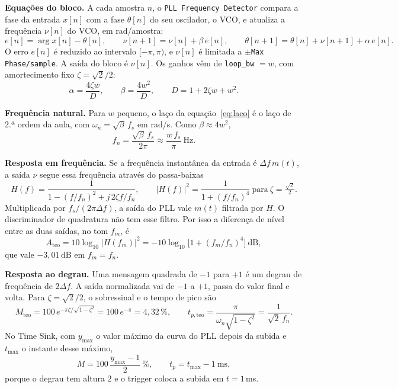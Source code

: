 \documentclass[11pt,a4paper]{article}
\begin{document}
\textbf{Equações do bloco.} A cada amostra $n$, o \texttt{PLL Frequency
Detector} compara a fase da entrada $x[n]$ com a fase $\theta[n]$ do seu
oscilador, o VCO, e atualiza a frequência $\nu[n]$ do VCO, em rad/amostra:
\begin{equation}
  e[n] = \arg x[n] - \theta[n], \qquad
  \nu[n+1] = \nu[n] + \beta\, e[n], \qquad
  \theta[n+1] = \theta[n] + \nu[n+1] + \alpha\, e[n].
  \label{eq:laco}
\end{equation}
O erro $e[n]$ é reduzido ao intervalo $[-\pi, \pi)$, e $\nu[n]$ é limitada a
$\pm$\texttt{Max Phase/sample}. A saída do bloco é $\nu[n]$. Os ganhos vêm de
\texttt{loop\_bw} $= w$, com amortecimento fixo $\zeta = \sqrt2/2$:
\begin{equation}
  \alpha = \frac{4\zeta w}{D}, \qquad \beta = \frac{4w^2}{D}, \qquad
  D = 1 + 2\zeta w + w^2.
  \label{eq:ganhos}
\end{equation}

\textbf{Frequência natural.} Para $w$ pequeno, o laço da
equação~\eqref{eq:laco} é o laço de 2.ª ordem da aula, com
$\omega_n = \sqrt{\beta}\,f_s$ em rad/s. Como $\beta \approx 4w^2$,
\begin{equation}
  f_n = \frac{\sqrt{\beta}\,f_s}{2\pi} \approx \frac{w\,f_s}{\pi}\ \text{Hz}.
  \label{eq:fn}
\end{equation}

\textbf{Resposta em frequência.} Se a frequência instantânea da entrada é
$\Delta f\, m(t)$, a saída $\nu$ segue essa frequência através do passa-baixas
\begin{equation}
  H(f) = \frac{1}{1 - (f/f_n)^2 + j\,2\zeta f/f_n}, \qquad
  |H(f)|^2 = \frac{1}{1 + (f/f_n)^4}\ \text{para}\ \zeta = \tfrac{\sqrt2}{2}.
  \label{eq:H}
\end{equation}
Multiplicada por $f_s/(2\pi\Delta f)$, a saída do PLL vale $m(t)$ filtrada por
$H$. O discriminador de quadratura não tem esse filtro. Por isso a diferença de
nível entre as duas saídas, no tom $f_m$, é
\begin{equation}
  A_\text{teo} = 10\log_{10}|H(f_m)|^2 = -10\log_{10}\!\big[1 + (f_m/f_n)^4\big]\ \text{dB},
  \label{eq:A}
\end{equation}
que vale $-3{,}01$\,dB em $f_m = f_n$.

\textbf{Resposta ao degrau.} Uma mensagem quadrada de $-1$ para $+1$ é um degrau
de frequência de $2\Delta f$. A saída normalizada vai de $-1$ a $+1$, passa do
valor final e volta. Para $\zeta = \sqrt2/2$, o sobressinal e o tempo de pico
são
\begin{equation}
  M_\text{teo} = 100\, e^{-\pi\zeta/\sqrt{1-\zeta^2}} = 100\,e^{-\pi} = 4{,}32\,\%,
  \qquad
  t_{p,\text{teo}} = \frac{\pi}{\omega_n\sqrt{1-\zeta^2}} = \frac{1}{\sqrt2\, f_n}.
  \label{eq:degrau}
\end{equation}
No Time Sink, com $y_\text{max}$ o valor máximo da curva do PLL depois da
subida e $t_\text{max}$ o instante desse máximo,
\begin{equation}
  M = 100\,\frac{y_\text{max} - 1}{2}\ \%, \qquad
  t_p = t_\text{max} - 1\ \text{ms},
  \label{eq:M}
\end{equation}
porque o degrau tem altura $2$ e o trigger coloca a subida em $t = 1$\,ms.
\end{document}
